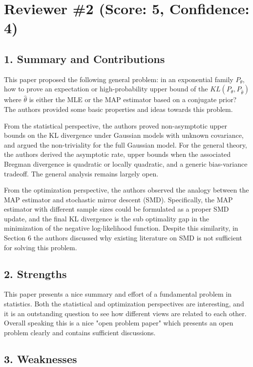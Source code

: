 \newpage

\section*{Reviewer \#2 (Score: 5, Confidence: 4)}

\subsection*{1. Summary and Contributions}

This paper proposed the following general problem: in an exponential family $P_\theta$, how to prove an expectation or high-probability upper bound of the $KL(P_\theta, P_{\hat\theta})$ where $\hat\theta$ is either the MLE or the MAP estimator based on a conjugate prior? The authors provided some basic properties and ideas towards this problem.

From the statistical perspective, the authors proved non-asymptotic upper bounds on the KL divergence under Gaussian models with unknown covariance, and argued the non-triviality for the full Gaussian model. For the general theory, the authors derived the asymptotic rate, upper bounds when the associated Bregman divergence is quadratic or locally quadratic, and a generic bias-variance tradeoff. The general analysis remains largely open.

From the optimization perspective, the authors observed the analogy between the MAP estimator and stochastic mirror descent (SMD). Specifically, the MAP estimator with different sample sizes could be formulated as a proper SMD update, and the final KL divergence is the sub optimality gap in the minimization of the negative log-likelihood function. Despite this similarity, in Section 6 the authors discussed why existing literature on SMD is not sufficient for solving this problem.

\subsection*{2. Strengths}

This paper presents a nice summary and effort of a fundamental problem in statistics. Both the statistical and optimization perspectives are interesting, and it is an outstanding question to see how different views are related to each other. Overall speaking this is a nice "open problem paper" which presents an open problem clearly and contains sufficient discussions.

\subsection*{3. Weaknesses}

